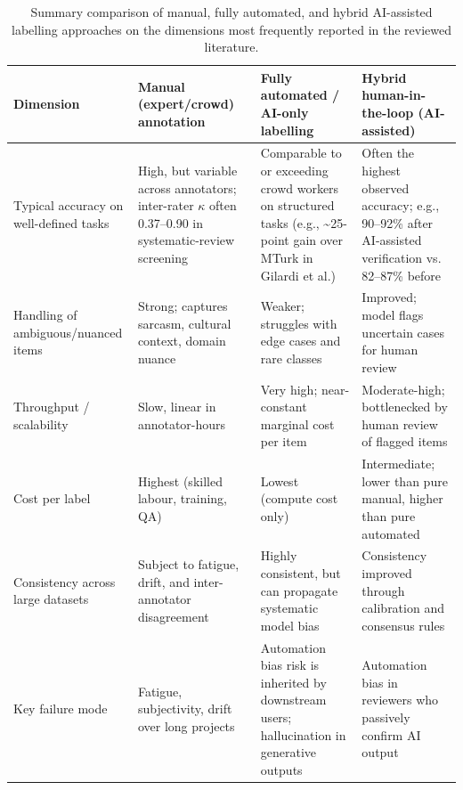 \documentclass[acmsmall,nonacm]{acmart}
\begin{document}
\begin{table}[t]
\caption{Summary comparison of manual, fully automated, and hybrid AI-assisted labelling approaches on the dimensions most frequently reported in the reviewed literature.}
\label{tab:results}
\centering
\small
\setlength{\tabcolsep}{3pt}
\renewcommand{\arraystretch}{1.2}
\begin{tabularx}{\textwidth}{@{}>{\raggedright\arraybackslash}p{}
                                  >{\raggedright\arraybackslash}X
                                  >{\raggedright\arraybackslash}X
                                  >{\raggedright\arraybackslash}X@{}}
\toprule
\textbf{Dimension} &
\textbf{Manual (expert/crowd) annotation} &
\textbf{Fully automated / AI-only labelling} &
\textbf{Hybrid human-in-the-loop (AI-assisted)} \\
\midrule
Typical accuracy on well-defined tasks &
High, but variable across annotators; inter-rater $\kappa$ often 0.37--0.90 in systematic-review screening &
Comparable to or exceeding crowd workers on structured tasks (e.g., \textasciitilde{}25-point gain over MTurk in Gilardi et al.) &
Often the highest observed accuracy; e.g., 90--92\% after AI-assisted verification vs. 82--87\% before \\
\addlinespace

Handling of ambiguous/nuanced items &
Strong; captures sarcasm, cultural context, domain nuance &
Weaker; struggles with edge cases and rare classes &
Improved; model flags uncertain cases for human review \\
\addlinespace

Throughput / scalability &
Slow, linear in annotator-hours &
Very high; near-constant marginal cost per item &
Moderate-high; bottlenecked by human review of flagged items \\
\addlinespace

Cost per label &
Highest (skilled labour, training, QA) &
Lowest (compute cost only) &
Intermediate; lower than pure manual, higher than pure automated \\
\addlinespace

Consistency across large datasets &
Subject to fatigue, drift, and inter-annotator disagreement &
Highly consistent, but can propagate systematic model bias &
Consistency improved through calibration and consensus rules \\
\addlinespace

Key failure mode &
Fatigue, subjectivity, drift over long projects &
Automation bias risk is inherited by downstream users; hallucination in generative outputs &
Automation bias in reviewers who passively confirm AI output \\
\bottomrule
\end{tabularx}
\end{table}
\end{document}
